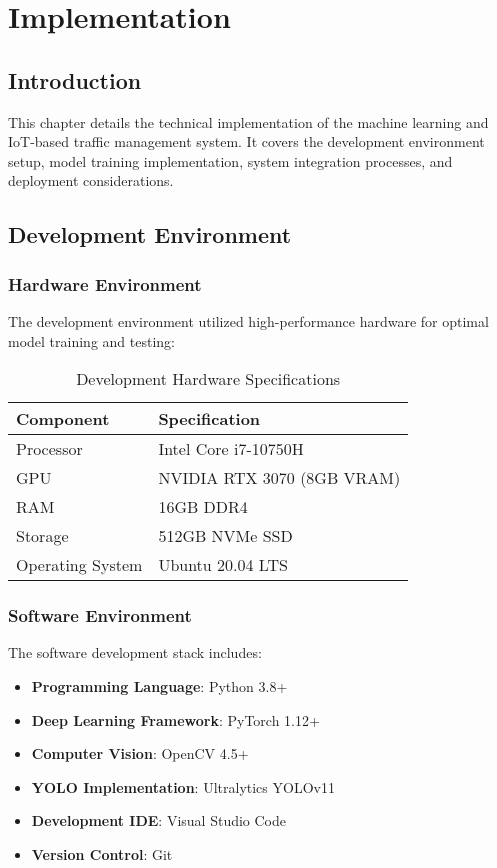 \chapter{Implementation}
\label{ch:implementation}

\section{Introduction}

This chapter details the technical implementation of the machine learning and IoT-based traffic management system. It covers the development environment setup, model training implementation, system integration processes, and deployment considerations.

\section{Development Environment}

\subsection{Hardware Environment}

The development environment utilized high-performance hardware for optimal model training and testing:

\begin{table}[h]
\centering
\caption{Development Hardware Specifications}
\begin{tabular}{|l|l|}
\hline
\textbf{Component} & \textbf{Specification} \\
\hline
Processor & Intel Core i7-10750H \\
GPU & NVIDIA RTX 3070 (8GB VRAM) \\
RAM & 16GB DDR4 \\
Storage & 512GB NVMe SSD \\
Operating System & Ubuntu 20.04 LTS \\
\hline
\end{tabular}
\end{table}

\subsection{Software Environment}

The software development stack includes:

\begin{itemize}
    \item \textbf{Programming Language}: Python 3.8+
    \item \textbf{Deep Learning Framework}: PyTorch 1.12+
    \item \textbf{Computer Vision}: OpenCV 4.5+
    \item \textbf{YOLO Implementation}: Ultralytics YOLOv11
    \item \textbf{Development IDE}: Visual Studio Code
    \item \textbf{Version Control}: Git
\end{itemize}

